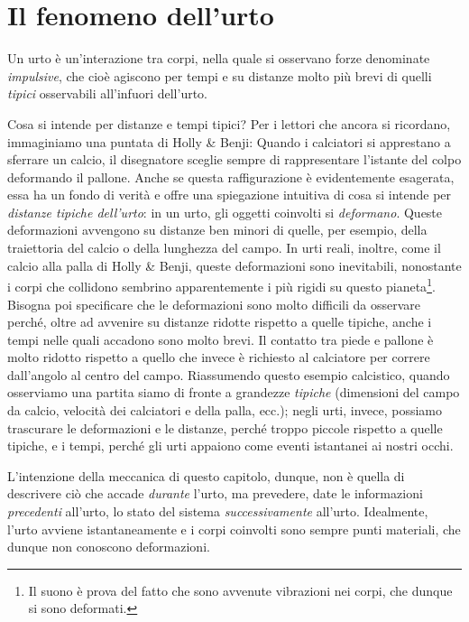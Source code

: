 \section{Il fenomeno dell'urto}

\vspace{8pt}
\begin{tcolorbox}[colback = yellow!30, colframe = yellow!30!black, title = {Urto}]
    Un urto è un'interazione tra corpi, nella quale si osservano forze
    denominate \textit{impulsive}, che cioè agiscono per tempi e su distanze
    molto più brevi di quelli \textit{tipici} osservabili all'infuori
    dell'urto.
\end{tcolorbox}
\vspace{5pt}

Cosa si intende per distanze e tempi tipici? Per i lettori che ancora si
ricordano, immaginiamo una puntata di Holly \& Benji: Quando i calciatori
si apprestano a sferrare un calcio, il disegnatore sceglie sempre
di rappresentare l'istante del colpo deformando il pallone. Anche se questa
raffigurazione è evidentemente esagerata, essa ha un fondo di verità e offre una spiegazione
intuitiva di cosa si intende per \textit{distanze tipiche dell'urto}: in un
urto, gli oggetti coinvolti si \textit{deformano}. Queste deformazioni avvengono
su distanze ben minori di quelle, per esempio, della traiettoria del calcio o
della lunghezza del campo. In urti reali, inoltre,
come il calcio alla palla di Holly \& Benji, queste deformazioni sono inevitabili,
nonostante i corpi che collidono sembrino apparentemente i più rigidi su
questo pianeta\footnote{Il suono è prova del fatto che sono avvenute vibrazioni
nei corpi, che dunque si sono deformati.}. Bisogna poi specificare che le
deformazioni sono molto difficili da osservare perché, oltre ad avvenire su
distanze ridotte rispetto a quelle tipiche, anche i tempi nelle quali accadono
sono molto brevi. Il contatto tra piede e pallone è molto ridotto rispetto a
quello che invece è richiesto al calciatore per correre dall'angolo al centro
del campo. Riassumendo questo esempio calcistico, quando osserviamo una
partita siamo di fronte a grandezze \textit{tipiche} (dimensioni del campo da
calcio, velocità dei calciatori e della palla, ecc.); negli urti, invece,
possiamo trascurare le deformazioni e le distanze, perché troppo piccole
rispetto a quelle tipiche, e i tempi, perché gli urti appaiono come eventi
istantanei ai nostri occhi.

L'intenzione della meccanica di questo capitolo, dunque, non è quella di
descrivere ciò che accade \textit{durante} l'urto, ma prevedere, date le
informazioni \textit{precedenti} all'urto, lo stato del sistema
\textit{successivamente} all'urto. Idealmente, l'urto avviene istantaneamente
e i corpi coinvolti sono sempre punti materiali, che dunque non conoscono
deformazioni.

